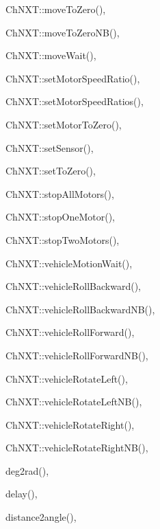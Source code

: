 \begin{theindex}
  \item ChNXT::moveToZero(), 
  \item ChNXT::moveToZeroNB(), 
  \item ChNXT::moveWait(), 
  \item ChNXT::setMotorSpeedRatio(), 
  \item ChNXT::setMotorSpeedRatios(), 
  \item ChNXT::setMotorToZero(), 
  \item ChNXT::setSensor(), 
  \item ChNXT::setToZero(), 
  \item ChNXT::stopAllMotors(), 
  \item ChNXT::stopOneMotor(), 
  \item ChNXT::stopTwoMotors(), 
  \item ChNXT::vehicleMotionWait(), 
  \item ChNXT::vehicleRollBackward(), 
  \item ChNXT::vehicleRollBackwardNB(), 
  \item ChNXT::vehicleRollForward(), 
  \item ChNXT::vehicleRollForwardNB(), 
  \item ChNXT::vehicleRotateLeft(), 
  \item ChNXT::vehicleRotateLeftNB(), 
  \item ChNXT::vehicleRotateRight(), 
  \item ChNXT::vehicleRotateRightNB(), 

  \indexspace

  \item deg2rad(), 
  \item delay(), 
  \item distance2angle(), 

  \indexspace


\end{theindex}
